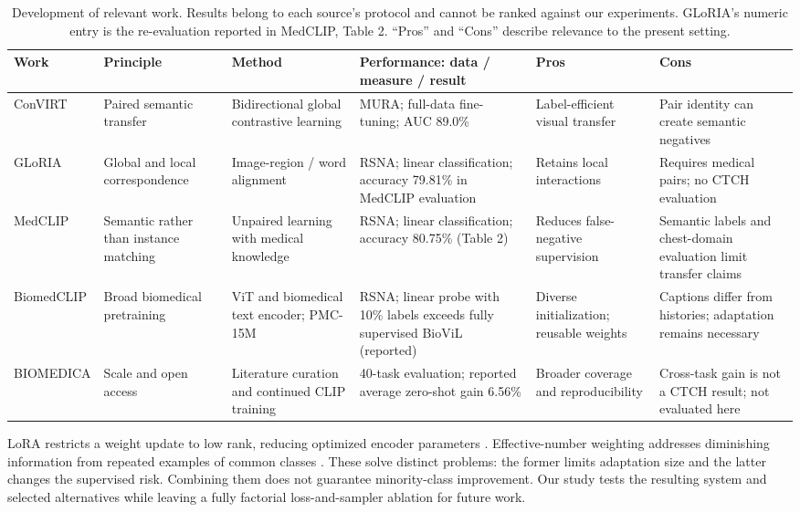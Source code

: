 \documentclass{llncs}
\begin{document}
\begin{table}[t]
\caption{Development of relevant work. Results belong to each source's protocol and cannot be ranked against our experiments. GLoRIA's numeric entry is the re-evaluation reported in MedCLIP, Table 2. ``Pros'' and ``Cons'' describe relevance to the present setting.}
\label{tab:related}
\centering\scriptsize
\setlength{\tabcolsep}{3pt}
\begin{tabularx}{\textwidth}{@{}p{18mm}YYYYY@{}}
\toprule
Work & Principle & Method & Performance: data / measure / result & Pros & Cons \\
\midrule
ConVIRT \cite{ConVIRT} & Paired semantic transfer & Bidirectional global contrastive learning & MURA; full-data fine-tuning; AUC 89.0\% & Label-efficient visual transfer & Pair identity can create semantic negatives \\
GLoRIA \cite{GLoRIA,MedCLIP} & Global and local correspondence & Image-region / word alignment & RSNA; linear classification; accuracy 79.81\% in MedCLIP evaluation & Retains local interactions & Requires medical pairs; no CTCH evaluation \\
MedCLIP \cite{MedCLIP} & Semantic rather than instance matching & Unpaired learning with medical knowledge & RSNA; linear classification; accuracy 80.75\% (Table 2) & Reduces false-negative supervision & Semantic labels and chest-domain evaluation limit transfer claims \\
BiomedCLIP \cite{BiomedCLIP} & Broad biomedical pretraining & ViT and biomedical text encoder; PMC-15M & RSNA; linear probe with 10\% labels exceeds fully supervised BioViL (reported) & Diverse initialization; reusable weights & Captions differ from histories; adaptation remains necessary \\
BIOMEDICA \cite{BIOMEDICA} & Scale and open access & Literature curation and continued CLIP training & 40-task evaluation; reported average zero-shot gain 6.56\% & Broader coverage and reproducibility & Cross-task gain is not a CTCH result; not evaluated here \\
\bottomrule
\end{tabularx}
\end{table}

LoRA restricts a weight update to low rank, reducing optimized encoder parameters \cite{Hu2022LoRA}. Effective-number weighting addresses diminishing information from repeated examples of common classes \cite{Cui2019ClassBalanced}. These solve distinct problems: the former limits adaptation size and the latter changes the supervised risk. Combining them does not guarantee minority-class improvement. Our study tests the resulting system and selected alternatives while leaving a fully factorial loss-and-sampler ablation for future work.
\end{document}
